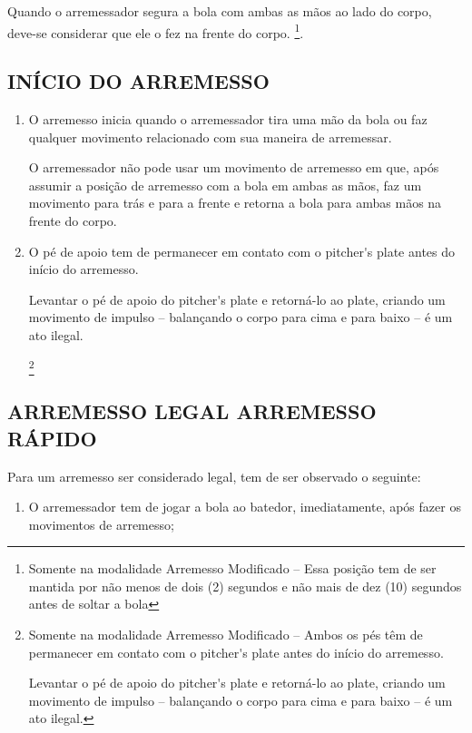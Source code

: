 \begin{multicols}{2}
\begin{enumerate}[label=\alph*)]
		Quando o arremessador segura a bola com ambas as m\~aos ao lado do corpo, deve-se considerar que ele o fez na frente do corpo. 
		\footnote{Somente na modalidade Arremesso Modificado -- Essa posi\c{c}\~ao tem de ser mantida por n\~ao menos de dois (2) segundos e n\~ao mais de dez (10) segundos antes de soltar a bola}.
	\end{enumerate}
	
	\subsection{INÍCIO DO ARREMESSO }
	\label{sssec:InicioArremesso}
	\begin{enumerate}[label=\alph*)]
		\item O arremesso inicia quando o arremessador tira uma m\~ao da bola ou faz qualquer 
		movimento relacionado com sua maneira de arremessar. 
		
		O arremessador n\~ao pode usar um movimento de arremesso em que, ap\'os assumir a posi\c{c}\~ao de arremesso com a bola em ambas as m\~aos, faz um movimento para tr\'as e para a frente e retorna a bola para ambas m\~aos na frente do corpo. 
		
		\item  O p\'e de apoio tem de permanecer em contato com o \gls{pitcher's plate} antes do in\'icio do arremesso. 
		
		Levantar o p\'e de apoio do \gls{pitcher's plate} e retorn\'a-lo ao \gls{plate}, criando um movimento de impulso -- balan\c{c}ando o corpo para cima e para baixo -- \'e um ato ilegal. 
		
		\footnote{Somente na modalidade Arremesso Modificado -- Ambos os p\'es t\^em de permanecer em contato com o \gls{pitcher's plate} antes do in\'icio do arremesso. 
		
		Levantar o p\'e de apoio do \gls{pitcher's plate} e retorn\'a-lo ao \gls{plate}, criando um movimento de impulso – balan\c{c}ando o corpo para cima e para baixo -- \'e um ato ilegal.} 
	\end{enumerate}
	
	\subsection{ARREMESSO LEGAL ARREMESSO R\'APIDO}
	Para um arremesso ser considerado legal, tem de ser observado o seguinte: 
	
	\begin{enumerate}[label=\alph*)]
		\item O arremessador tem de jogar a bola ao batedor, imediatamente, ap\'os fazer os movimentos de arremesso;
		

\end{enumerate}
\end{multicols}
